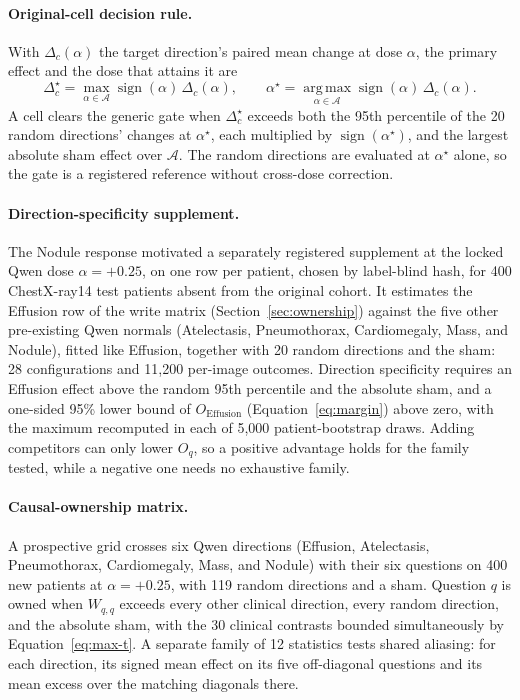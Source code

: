 \documentclass{article}
\begin{document}
\paragraph{Original-cell decision rule.}
With $\Delta_c(\alpha)$ the target direction's paired mean change at dose $\alpha$, the primary effect and the dose that attains it are
\begin{equation}
\Delta^\star_c=\max_{\alpha\in\mathcal A}\operatorname{sign}(\alpha)\,\Delta_c(\alpha),\qquad
\alpha^\star=\operatorname*{arg\,max}_{\alpha\in\mathcal A}\operatorname{sign}(\alpha)\,\Delta_c(\alpha).
\label{eq:seed-rule}
\end{equation}
A cell clears the generic gate when $\Delta^\star_c$ exceeds both the 95th percentile of the 20 random directions' changes at $\alpha^\star$, each multiplied by $\operatorname{sign}(\alpha^\star)$, and the largest absolute sham effect over $\mathcal A$. The random directions are evaluated at $\alpha^\star$ alone, so the gate is a registered reference without cross-dose correction.

\paragraph{Direction-specificity supplement.}
The Nodule response motivated a separately registered supplement at the locked Qwen dose $\alpha=+0.25$, on one row per patient, chosen by label-blind hash, for 400 ChestX-ray14 test patients absent from the original cohort. It estimates the Effusion row of the write matrix (Section~\ref{sec:ownership}) against the five other pre-existing Qwen normals (Atelectasis, Pneumothorax, Cardiomegaly, Mass, and Nodule), fitted like Effusion, together with 20 random directions and the sham: 28 configurations and 11,200 per-image outcomes. Direction specificity requires an Effusion effect above the random 95th percentile and the absolute sham, and a one-sided 95\% lower bound of $O_{\mathrm{Effusion}}$ (Equation~\ref{eq:margin}) above zero, with the maximum recomputed in each of 5,000 patient-bootstrap draws. Adding competitors can only lower $O_q$, so a positive advantage holds for the family tested, while a negative one needs no exhaustive family.

\paragraph{Causal-ownership matrix.}
A prospective grid crosses six Qwen directions (Effusion, Atelectasis, Pneumothorax, Cardiomegaly, Mass, and Nodule) with their six questions on 400 new patients at $\alpha=+0.25$, with 119 random directions and a sham. Question $q$ is owned when $W_{q,q}$ exceeds every other clinical direction, every random direction, and the absolute sham, with the 30 clinical contrasts bounded simultaneously by Equation~\ref{eq:max-t}. A separate family of 12 statistics tests shared aliasing: for each direction, its signed mean effect on its five off-diagonal questions and its mean excess over the matching diagonals there.
\end{document}
